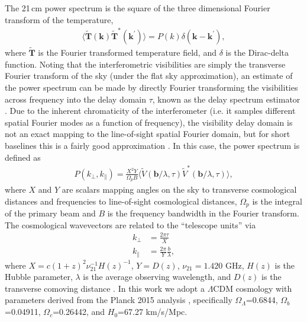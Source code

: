 \documentclass[a4paper,fleqn,usenatbib]{mnras}
\def\para{\parallel}
\def\T{\boldsymbol{T}}
\begin{document}
The 21\,cm power spectrum is the square of the three dimensional Fourier transform of the temperature,
\begin{align}
\langle\widetilde{\T}(\boldsymbol{k})\widetilde{\T}^\ast(\boldsymbol{k}^\prime)\rangle = P(k)\delta(\boldsymbol{k}-\boldsymbol{k}^\prime),
\end{align}
where $\widetilde{\T}$ is the Fourier transformed temperature field, and $\delta$ is the Dirac-delta function.
Noting that the interferometric visibilities are simply the transverse Fourier transform of the sky (under the flat sky approximation), an estimate of the power spectrum can be made by directly Fourier transforming the visibilities across frequency into the delay domain $\tau$, known as the delay spectrum estimator \citep{Parsons2012a, Liu2014a}.
Due to the inherent chromaticity of the interferometer (i.e. it samples different spatial Fourier modes as a function of frequency), the visibility delay domain is not an exact mapping to the line-of-sight spatial Fourier domain, but for short baselines this is a fairly good approximation \citep{Parsons2012a}.
In this case, the power spectrum is defined as
\begin{align}
\label{eq:dspec}
P(k_\perp, k_\para) = \frac{X^2Y}{\Omega_pB}\langle\widetilde{V}(\boldsymbol{b}/\lambda, \tau)\widetilde{V}^\ast(\boldsymbol{b}/\lambda, \tau)\rangle,
\end{align}
where $X$ and $Y$ are scalars mapping angles on the sky to transverse cosmological distances and frequencies to line-of-sight cosmological distances, $\Omega_p$ is the integral of the primary beam and $B$ is the frequency bandwidth in the Fourier transform.
The cosmological wavevectors are related to the ``telescope units'' via
\begin{align}
\label{eq:kvecs}
k_\perp &= \frac{2\pi\tau}{X} \\
k_\para  &= \frac{2\pi}{Y}\frac{b}{\lambda},
\end{align}
where $X = c(1+z)^2\nu_{21}^{-1}H(z)^{-1}$, $Y=D(z)$, $\nu_{21}=1.420$ GHz, $H(z)$ is the Hubble parameter, $\lambda$ is the average observing wavelength, and $D(z)$ is the transverse comoving distance \citep{Parsons2014}.
In this work we adopt a $\Lambda$CDM cosmology with parameters derived from the Planck 2015 analysis \citep{Planck2016}, specifically $\Omega_\Lambda$=0.6844, $\Omega_b$=0.04911, $\Omega_c$=0.26442, and $H_0$=67.27 km/s/Mpc.
\end{document}
